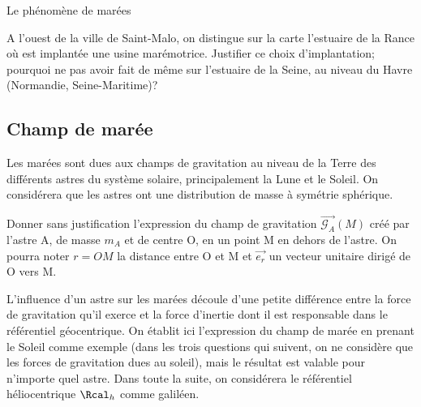 \begin{exo}[PC][1][devoir]{Le phénomène de marées}
\begin{quest}
  \item A l'ouest de la ville de Saint-Malo, on distingue sur la carte l'estuaire de la Rance où est implantée une usine marémotrice. Justifier ce choix d'implantation; pourquoi ne pas avoir fait de même sur l'estuaire de la Seine, au niveau du Havre (Normandie, Seine-Maritime)?

  \end{quest}

  \subsection{Champ de marée}
  \label{sec:champ}

  Les marées sont dues aux champs de gravitation au niveau de la Terre des différents astres du système solaire, principalement la Lune et le Soleil. On considérera que les astres ont une distribution de masse à symétrie sphérique.

  \begin{quest}
  \item Donner sans justification l'expression du champ de gravitation $\Vec {{\mathcal{G}_A}} (M)$ créé par l'astre A, de masse $m_A$ et de centre O, en un point M en dehors de l'astre. On pourra noter $r=OM$ la distance entre O et M et
  $\Vec {{e_r}} $ un vecteur unitaire dirigé de O vers M.

  \end{quest}
   L'influence d'un astre sur les marées découle d'une petite différence entre la force de gravitation qu'il exerce et la force d'inertie dont il est responsable dans le référentiel géocentrique. On établit ici l'expression du champ de marée en prenant le Soleil comme exemple (dans les trois questions qui suivent, on ne considère que les forces de gravitation dues au soleil), mais le résultat est valable pour n'importe quel astre.
  Dans toute la suite, on considérera le référentiel héliocentrique $\Rcal_h$ comme galiléen.
  \begin{quest}


\end{quest}
\end{exo}
